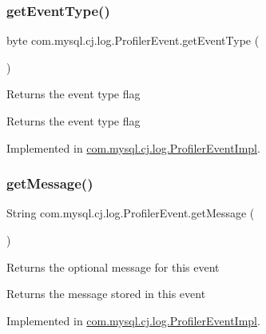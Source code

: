 \subsubsection{\texorpdfstring{get\+Event\+Type()}{getEventType()}}
{\footnotesize\ttfamily byte com.\+mysql.\+cj.\+log.\+Profiler\+Event.\+get\+Event\+Type (\begin{DoxyParamCaption}{ }\end{DoxyParamCaption})}

Returns the event type flag

\begin{DoxyReturn}{Returns}
the event type flag 
\end{DoxyReturn}


Implemented in \mbox{\hyperlink{classcom_1_1mysql_1_1cj_1_1log_1_1_profiler_event_impl_a617ef1b80526a6401966ce38ad320872}{com.\+mysql.\+cj.\+log.\+Profiler\+Event\+Impl}}.

\mbox{\label{interfacecom_1_1mysql_1_1cj_1_1log_1_1_profiler_event_aebc12f64998b49e30c39a61e08f34a2c}} 
\subsubsection{\texorpdfstring{get\+Message()}{getMessage()}}
{\footnotesize\ttfamily String com.\+mysql.\+cj.\+log.\+Profiler\+Event.\+get\+Message (\begin{DoxyParamCaption}{ }\end{DoxyParamCaption})}

Returns the optional message for this event

\begin{DoxyReturn}{Returns}
the message stored in this event 
\end{DoxyReturn}


Implemented in \mbox{\hyperlink{classcom_1_1mysql_1_1cj_1_1log_1_1_profiler_event_impl_aea930b7a299a44946aea7544c5df2a7d}{com.\+mysql.\+cj.\+log.\+Profiler\+Event\+Impl}}.

\mbox{\label{interfacecom_1_1mysql_1_1cj_1_1log_1_1_profiler_event_abe44cf020bbacb1e6c854de7cc8625c9}} 
